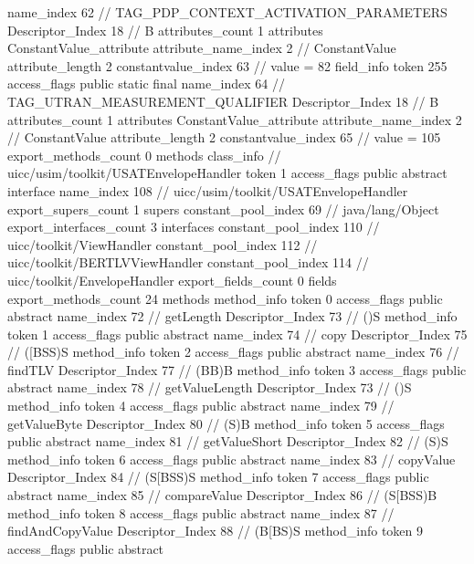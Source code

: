 {{{{{				name_index	62		// TAG_PDP_CONTEXT_ACTIVATION_PARAMETERS
				Descriptor_Index	18		// B
				attributes_count	1
				attributes {
				ConstantValue_attribute {
					attribute_name_index	2		// ConstantValue
					attribute_length	2
					constantvalue_index	63		// value = 82
				}
				}
			}
			field_info {
				token	255
				access_flags	public static final
				name_index	64		// TAG_UTRAN_MEASUREMENT_QUALIFIER
				Descriptor_Index	18		// B
				attributes_count	1
				attributes {
				ConstantValue_attribute {
					attribute_name_index	2		// ConstantValue
					attribute_length	2
					constantvalue_index	65		// value = 105
				}
				}
			}
			}
			export_methods_count	0
			methods {
			}
		}
		class_info {		// uicc/usim/toolkit/USATEnvelopeHandler
			token	1
			access_flags	public abstract interface
			name_index	108		// uicc/usim/toolkit/USATEnvelopeHandler
			export_supers_count	1
			supers {
				constant_pool_index	69		// java/lang/Object
			}
			export_interfaces_count	3
			interfaces {
				constant_pool_index	110		// uicc/toolkit/ViewHandler
				constant_pool_index	112		// uicc/toolkit/BERTLVViewHandler
				constant_pool_index	114		// uicc/toolkit/EnvelopeHandler
			}
			export_fields_count	0
			fields {
			}
			export_methods_count	24
			methods {
				method_info {
					token	0
					access_flags	public abstract
					name_index	72		// getLength
					Descriptor_Index	73		// ()S
				}
				method_info {
					token	1
					access_flags	public abstract
					name_index	74		// copy
					Descriptor_Index	75		// ([BSS)S
				}
				method_info {
					token	2
					access_flags	public abstract
					name_index	76		// findTLV
					Descriptor_Index	77		// (BB)B
				}
				method_info {
					token	3
					access_flags	public abstract
					name_index	78		// getValueLength
					Descriptor_Index	73		// ()S
				}
				method_info {
					token	4
					access_flags	public abstract
					name_index	79		// getValueByte
					Descriptor_Index	80		// (S)B
				}
				method_info {
					token	5
					access_flags	public abstract
					name_index	81		// getValueShort
					Descriptor_Index	82		// (S)S
				}
				method_info {
					token	6
					access_flags	public abstract
					name_index	83		// copyValue
					Descriptor_Index	84		// (S[BSS)S
				}
				method_info {
					token	7
					access_flags	public abstract
					name_index	85		// compareValue
					Descriptor_Index	86		// (S[BSS)B
				}
				method_info {
					token	8
					access_flags	public abstract
					name_index	87		// findAndCopyValue
					Descriptor_Index	88		// (B[BS)S
				}
				method_info {
					token	9
					access_flags	public abstract
}}}}}

